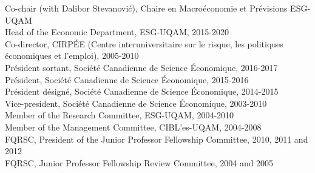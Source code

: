 \noindent 
Co-chair (with Dalibor Stevanovi\'c), Chaire en Macro\'economie et Pr\'evisions ESG-UQAM
\vspace{.2cm}\\
Head of the Economic Department, ESG-UQAM, 2015-2020
\vspace{.2cm}\\
Co-director, CIRP\'EE (Centre  interuniversitaire sur le
risque, les politiques \'economiques et
l'emploi), 2005-2010
\vspace{.2cm}\\
Pr\'esident sortant, Soci\'et\'e Canadienne de Science \'Economique, 2016-2017
\vspace{.2cm}\\
Pr\'esident, Soci\'et\'e Canadienne de Science \'Economique, 2015-2016
\vspace{.2cm}\\
Pr\'esident d\'esign\'e, Soci\'et\'e Canadienne de Science \'Economique, 2014-2015
\vspace{.2cm}\\
Vice-president, Soci\'et\'e Canadienne de Science \'Economique, 2003-2010
\vspace{.2cm}\\
Member of the Research Committee, ESG-UQAM, 2004-2010
\vspace{.2cm}\\
Member of the Management Committee, CIBL'es-UQAM, 2004-2008
\vspace{.2cm}\\
FQRSC, President of the Junior Professor Fellowship Committee, 2010, 2011 and 2012
\vspace{.2cm}\\
FQRSC, Junior Professor Fellowship Review Committee, 2004 and 2005



\vspace{.6cm}

 \vspace{.3cm}

